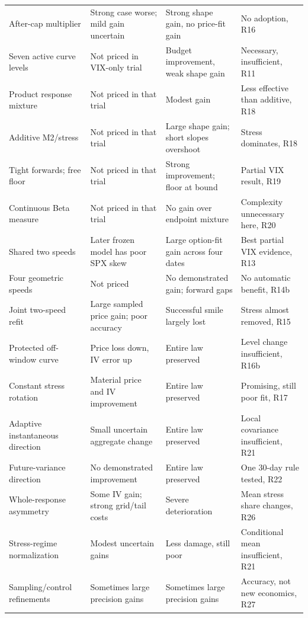 \documentclass[11pt,a4paper]{article}
\begin{document}
\begin{longtable}{@{}>{\raggedright\arraybackslash}p{.22\linewidth}>{\raggedright\arraybackslash}p{.25\linewidth}>{\raggedright\arraybackslash}p{.25\linewidth}>{\raggedright\arraybackslash}p{.20\linewidth}@{}}
After-cap multiplier & Strong case worse; mild gain uncertain & Strong shape gain, no price-fit gain & No adoption, R16\\
Seven active curve levels & Not priced in VIX-only trial & Budget improvement, weak shape gain & Necessary, insufficient, R11\\
Product response mixture & Not priced in that trial & Modest gain & Less effective than additive, R18\\
Additive M2/stress & Not priced in that trial & Large shape gain; short slopes overshoot & Stress dominates, R18\\
Tight forwards; free floor & Not priced in that trial & Strong improvement; floor at bound & Partial VIX result, R19\\
Continuous Beta measure & Not priced in that trial & No gain over endpoint mixture & Complexity unnecessary here, R20\\
Shared two speeds & Later frozen model has poor SPX skew & Large option-fit gain across four dates & Best partial VIX evidence, R13\\
Four geometric speeds & Not priced & No demonstrated gain; forward gaps & No automatic benefit, R14b\\
Joint two-speed refit & Large sampled price gain; poor accuracy & Successful smile largely lost & Stress almost removed, R15\\
Protected off-window curve & Price loss down, IV error up & Entire law preserved & Level change insufficient, R16b\\
Constant stress rotation & Material price and IV improvement & Entire law preserved & Promising, still poor fit, R17\\
Adaptive instantaneous direction & Small uncertain aggregate change & Entire law preserved & Local covariance insufficient, R21\\
Future-variance direction & No demonstrated improvement & Entire law preserved & One 30-day rule tested, R22\\
Whole-response asymmetry & Some IV gain; strong grid/tail costs & Severe deterioration & Mean stress share changes, R26\\
Stress-regime normalization & Modest uncertain gains & Less damage, still poor & Conditional mean insufficient, R21\\
Sampling/control refinements & Sometimes large precision gains & Sometimes large precision gains & Accuracy, not new economics, R27\\\bottomrule
\end{longtable}
\normalsize
\end{document}
